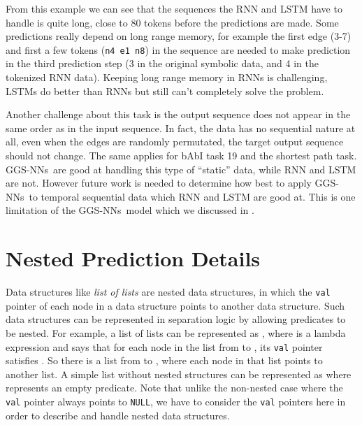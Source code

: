 \documentclass{article} \usepackage{iclr2016_conference,times}
\newcommand{\OurMethodShort}{GGS-NN}
\newcommand{\OurMethodShorts}{\OurMethodShort s}
\begin{document}
From this example we can see that the sequences the RNN and LSTM have to
handle is quite long, close to 80 tokens before the predictions are made. Some
predictions really depend on long range memory, for example the first edge
(3-7) and first a few tokens (\texttt{n4 e1 n8}) in the sequence are needed to
make prediction in the third prediction step (3 in the original symbolic data,
and 4 in the tokenized RNN data). Keeping long range memory in RNNs is
challenging, LSTMs do better than RNNs but still can't completely solve the
problem.

Another challenge about this task is the output sequence does not appear in
the same order as in the input sequence.  In fact, the data has no sequential
nature at all, even when the edges are randomly permutated, the target output
sequence should not change.  The same applies for bAbI task 19 and the shortest
path task. \OurMethodShorts~are good at handling this type of ``static'' data,
while RNN and LSTM are not.  However future work is needed to determine how
best to apply \OurMethodShorts~to temporal sequential data which RNN and LSTM are good at.
This is one limitation of the \OurMethodShorts~model which we discussed in
.


\section{Nested Prediction Details}
\label{appendix:nested-prediction}

Data structures like \emph{list of lists} are nested data structures, in which
the \texttt{val} pointer of each node in a data structure points to another data
structure.  Such data structures can
be represented in separation logic by allowing predicates to be nested.  For
example, a list of lists can be represented as , where  is a lambda expression and says that for each node in the
list from  to , its \texttt{val} pointer  satisfies . So there is
a list from  to , where each node in that list points to another list. A
simple list without nested structures can be represented as  where  represents an empty predicate. Note
that unlike the non-nested case where the \texttt{val} pointer always points
to \texttt{NULL}, we have to
consider the \texttt{val} pointers here in order to describe and handle nested data
structures.
\end{document}
